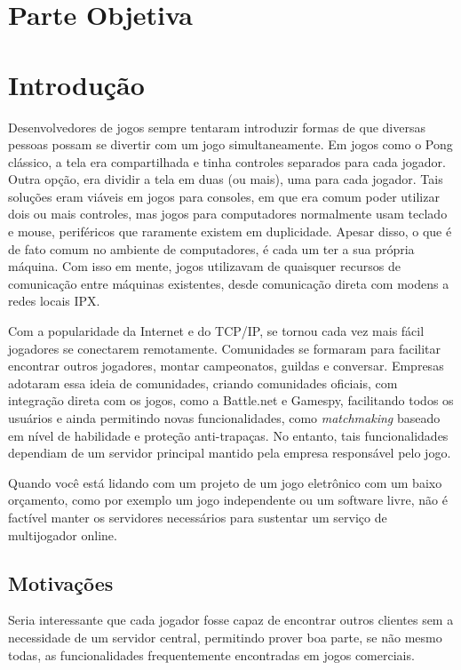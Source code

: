 \chapter*{Parte Objetiva}
\label{sec:parte_objetiva}
\chapter{Introdução}
\label{sec:intr}

Desenvolvedores de jogos sempre tentaram introduzir formas de que diversas
pessoas possam se divertir com um jogo simultaneamente. Em jogos como o Pong
clássico, a tela era compartilhada e tinha controles separados para cada 
jogador. Outra opção, era dividir a tela em duas (ou mais), uma para cada
jogador. Tais soluções eram viáveis em jogos para consoles, em que era comum
poder utilizar dois ou mais controles, mas jogos para computadores normalmente
usam teclado e mouse, periféricos que raramente existem em duplicidade.
Apesar disso, o que é de fato comum no ambiente de computadores, é cada um ter
a sua própria máquina. Com isso em mente, jogos utilizavam de quaisquer recursos
de comunicação entre máquinas existentes, desde comunicação direta com modens
a redes locais IPX.

Com a popularidade da Internet e do TCP/IP, se tornou cada vez mais fácil
jogadores se conectarem remotamente. Comunidades se formaram para facilitar
encontrar outros jogadores, montar campeonatos, guildas e conversar. Empresas
adotaram essa ideia de comunidades, criando comunidades oficiais, com integração
direta com os jogos, como a Battle.net e Gamespy, facilitando todos os usuários 
e ainda permitindo novas funcionalidades, como \textit{matchmaking} baseado em
nível de habilidade e proteção anti-trapaças. No entanto, tais funcionalidades
dependiam de um servidor principal mantido pela empresa responsável pelo jogo.

Quando você está lidando com um projeto de um jogo eletrônico com um baixo
orçamento, como por exemplo um jogo independente ou um software livre, não é
factível manter os servidores necessários para sustentar um serviço de
multijogador online.

\section{Motivações}
\label{sec:intr:motivacoes}

Seria interessante que cada jogador fosse capaz de encontrar outros clientes
sem a necessidade de um servidor central, permitindo prover boa parte, se não
mesmo todas, as funcionalidades frequentemente encontradas em jogos comerciais.

